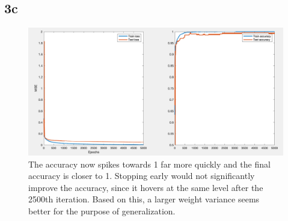 \documentclass[]{article}
\begin{document}
\subsection*{3c}
\begin{figure}[H]
    \centering
    \includegraphics[width=0.7\linewidth]{problem3C.png}
    \caption{The accuracy now spikes towards 1 far more quickly and the final accuracy is closer to 1. Stopping early would not significantly improve the accuracy, since it hovers at the same level after the 2500th iteration. Based on this, a larger weight variance seems better for the purpose of generalization.}
    \label{fig:my_label}
\end{figure}
\end{document}
